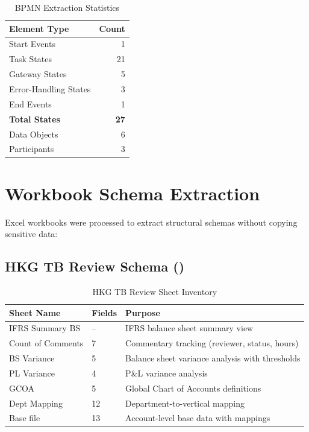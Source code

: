 \begin{table}[h]
\centering
\caption{BPMN Extraction Statistics}
\label{tab:bpmn-statistics}
\begin{tabular}{@{}lr@{}}
\toprule
\textbf{Element Type} & \textbf{Count} \\
\midrule
Start Events & 1 \\
Task States & 21 \\
Gateway States & 5 \\
Error-Handling States & 3 \\
End Events & 1 \\
\midrule
\textbf{Total States} & \textbf{27} \\
\midrule
Data Objects & 6 \\
Participants & 3 \\
\bottomrule
\end{tabular}
\end{table}

\section{Workbook Schema Extraction}
\label{sec:workbook-schema}

Excel workbooks were processed to extract structural schemas without
copying sensitive data:

\subsection{HKG TB Review Schema ()}

\begin{table}[h]
\centering
\caption{HKG TB Review Sheet Inventory}
\label{tab:hkg-tb-sheets}
\begin{tabularx}{\textwidth}{@{}L{4cm}C{2cm}L{7.5cm}@{}}
\toprule
\textbf{Sheet Name} & \textbf{Fields} & \textbf{Purpose} \\
\midrule
IFRS Summary BS & -- & IFRS balance sheet summary view \\
Count of Comments & 7 & Commentary tracking (reviewer, status, hours) \\
BS Variance & 5 & Balance sheet variance analysis with thresholds \\
PL Variance & 4 & P\&L variance analysis \\
GCOA & 5 & Global Chart of Accounts definitions \\
Dept Mapping & 12 & Department-to-vertical mapping \\
Base file & 13 & Account-level base data with mappings \\
\bottomrule
\end{tabularx}
\end{table}

